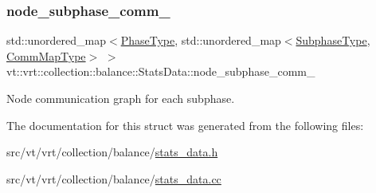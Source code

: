 \mbox{\label{structvt_1_1vrt_1_1collection_1_1balance_1_1_stats_data_ac78802ff554a4d802a163afa5756412e}} 
\subsubsection{\texorpdfstring{node\+\_\+subphase\+\_\+comm\+\_\+}{node\_subphase\_comm\_}}
{\footnotesize\ttfamily std\+::unordered\+\_\+map$<$\hyperlink{namespacevt_a46ce6733d5cdbd735d561b7b4029f6d7}{Phase\+Type}, std\+::unordered\+\_\+map$<$\hyperlink{namespacevt_ae78cbfdf1e57470e33eedb074f2beeba}{Subphase\+Type}, \hyperlink{namespacevt_1_1vrt_1_1collection_1_1balance_a10860c956804d644db54a16012352728}{Comm\+Map\+Type}$>$ $>$ vt\+::vrt\+::collection\+::balance\+::\+Stats\+Data\+::node\+\_\+subphase\+\_\+comm\+\_\+}



Node communication graph for each subphase. 



The documentation for this struct was generated from the following files\+:\begin{DoxyCompactItemize}
\item 
src/vt/vrt/collection/balance/\hyperlink{stats__data_8h}{stats\+\_\+data.\+h}\item 
src/vt/vrt/collection/balance/\hyperlink{stats__data_8cc}{stats\+\_\+data.\+cc}\end{DoxyCompactItemize}
